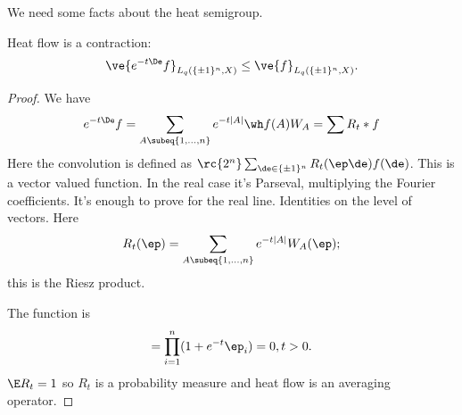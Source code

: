 We need some facts about the heat semigroup.
\begin{fct}[Fact 1]
Heat flow is a contraction:
\[
\ve{e^{-t\De}f}_{L_q(\{\pm 1\}^n,X)}\le \ve{f}_{L_q(\{\pm 1\}^n,X)}.
\]
\end{fct}
\begin{proof}
We have
\[
e^{-t\De} f = \sum_{A\subeq \{1,\ldots, n\}}e^{-t|A|}\wh f(A) W_A = \sum R_t*f
%
\]
Here the convolution is defined as $\rc{2^n}\sum_{\de\in \{\pm 1\}^n} R_t(\ep\de)f(\de)$. %
This is a vector valued function. In the real case it's Parseval, multiplying the Fourier coefficients. 
It's enough to prove for the real line. Identities on the level of vectors. 
Here
\[
R_t(\ep)=\sum_{A\subeq \{1,\ldots, n\}}  e^{-t|A|}W_A(\ep);
\]
this is the Riesz product.

The function is 
\[
= \prod_{i=1}^n (1+e^{-t}\ep_i)=0,t>0.
\]
$\E R_t=1$ so $R_t$ is a probability measure and heat flow is an averaging operator.
\end{proof}